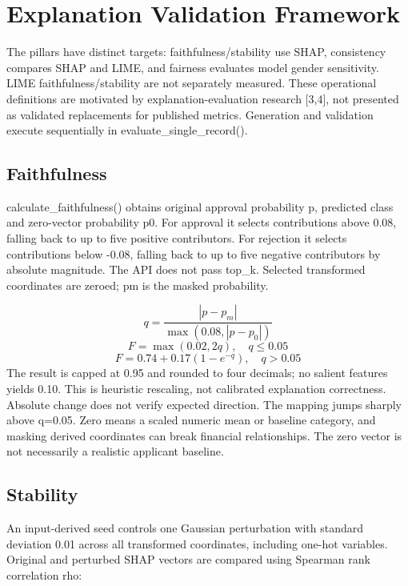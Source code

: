 \documentclass[12pt,a4paper]{report}
\begin{document}
\section{Explanation Validation Framework}
The pillars have distinct targets: faithfulness/stability use SHAP, consistency compares SHAP and LIME, and fairness evaluates model gender sensitivity. LIME faithfulness/stability are not separately measured. These operational definitions are motivated by explanation-evaluation research [3,4], not presented as validated replacements for published metrics. Generation and validation execute sequentially in evaluate\_single\_record().

\subsection{Faithfulness}
calculate\_faithfulness() obtains original approval probability p, predicted class and zero-vector probability p0. For approval it selects contributions above 0.08, falling back to up to five positive contributors. For rejection it selects contributions below -0.08, falling back to up to five negative contributors by absolute magnitude. The API does not pass top\_k. Selected transformed coordinates are zeroed; pm is the masked probability.

\begin{equation}q=\frac{|p-p_m|}{\max(0.08,|p-p_0|)}\end{equation}
\begin{equation}F=\max(0.02,2q),\quad q\leq 0.05\end{equation}
\begin{equation}F=0.74+0.17(1-e^{-q}),\quad q>0.05\end{equation}
The result is capped at 0.95 and rounded to four decimals; no salient features yields 0.10. This is heuristic rescaling, not calibrated explanation correctness. Absolute change does not verify expected direction. The mapping jumps sharply above q=0.05. Zero means a scaled numeric mean or baseline category, and masking derived coordinates can break financial relationships. The zero vector is not necessarily a realistic applicant baseline.

\subsection{Stability}
An input-derived seed controls one Gaussian perturbation with standard deviation 0.01 across all transformed coordinates, including one-hot variables. Original and perturbed SHAP vectors are compared using Spearman rank correlation rho:
\end{document}
